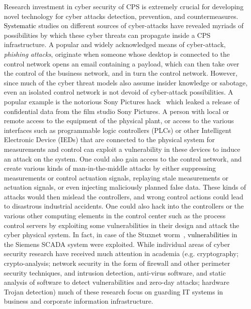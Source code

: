 \noindent
Research investment in cyber security of CPS is 
extremely crucial for developing novel technology for cyber attacks detection, prevention, and countermeasures. \textcolor{black} {Systematic} studies on different sources of cyber-attacks have revealed myriads of possibilities by which these cyber threats can 
propagate inside a CPS infrastructure. A popular and widely acknowledged means of cyber-attack, {\em phishing attacks}, originate when someone whose desktop
is connected to the control network opens an email containing a payload, which can then
take over the control of the business network, and in turn the control network. However, since
much of the cyber threat models also assume insider knowledge or sabotage, even an isolated
control network is not devoid of cyber-attack possibilities. A popular example  is the notorious Sony Pictures hack~\cite{SonyHack2014} which leaked a release of confidential data from the film studio Sony Pictures. A person with local or remote access
to the equipment of the physical plant, or access to the various interfaces such as programmable
logic controllers (PLCs) or other Intelligent Electronic Device (IEDs) that are connected to the
physical system for measurements and control can exploit a vulnerability in these devices to
induce an attack on the system. One could also gain access to the control network, and create
various kinds of man-in-the-middle attacks by either suppressing measurements or control
actuation signals, replaying stale measurements or actuation signals, or even injecting
maliciously planned false data. These kinds of attacks would then mislead the controllers, and
wrong control actions could lead to disastrous industrial accidents. One could also hack into the
controllers or the various other computing elements in the control center such as the process control servers by
exploiting some vulnerabilities in their design and attack the cyber physical system. In fact, in
case of the Stuxnet worm~\cite{stuxnet}, \textcolor{black} {vulnerabilities} in the Siemens SCADA system were exploited. While individual areas of cyber security research have received
much attention in academia (e.g. cryptography; crypto-analysis; network
security in the form of firewall and other perimeter security techniques, and intrusion detection, anti-virus software, and static analysis of software to detect vulnerabilities and zero-day attacks;
hardware Trojan detection) much of these research focus on guarding IT systems in business and corporate information infrastructure. \\ 

